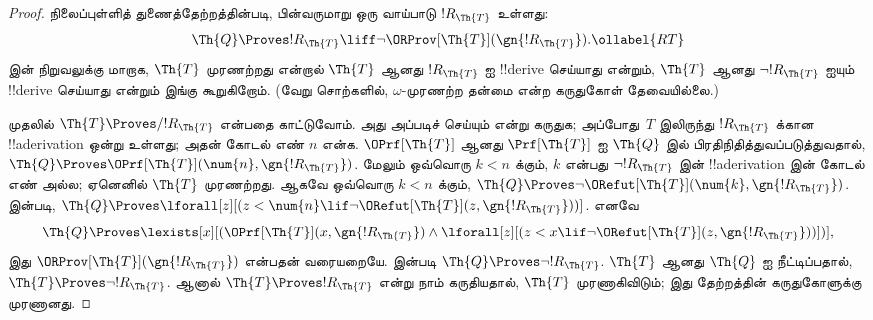 \documentclass[../../../include/open-logic-section]{subfiles}
\begin{document}
\begin{proof}
நிலைப்புள்ளித் துணைத்தேற்றத்தின்படி, பின்வருமாறு ஒரு வாய்பாடு
$!R_\Th{T}$ உள்ளது:
\begin{equation}
  \Th{Q} \Proves !R_\Th{T} \liff \lnot \ORProv[\Th{T}](\gn{!R_\Th{T}}).
  \ollabel{RT}
\end{equation}
 இன் நிறுவலுக்கு மாறாக,
$\Th{T}$ முரணற்றது என்றால் $\Th{T}$ ஆனது $!R_\Th{T}$ ஐ !!{derive}
செய்யாது என்றும், $\Th{T}$ ஆனது $\lnot !R_\Th{T}$ ஐயும்
!!{derive} செய்யாது என்றும்
இங்கு கூறுகிறோம். (வேறு சொற்களில், $\omega$-முரணற்ற தன்மை என்ற
கருதுகோள் தேவையில்லை.)

முதலில் $\Th{T} \Proves/ !R_{\Th{T}}$ என்பதை காட்டுவோம். அது
அப்படிச் செய்யும் என்று கருதுக; அப்போது~$T$ இலிருந்து
$!R_{\Th{T}}$ க்கான !!a{derivation} ஒன்று உள்ளது; அதன் கோடல் எண்
$n$ என்க. $\OPrf[\Th{T}]$ ஆனது $\Prf[\Th{T}]$ ஐ $\Th{Q}$ இல்
பிரதிநிதித்துவப்படுத்துவதால்,
$\Th{Q} \Proves
\OPrf[\Th{T}](\num{n}, \gn{!R_{\Th{T}}})$. மேலும் ஒவ்வொரு $k<n$ க்கும்,
$k$ என்பது $\lnot !R_{\Th{T}}$ இன் !!a{derivation} இன் கோடல் எண்
அல்ல; ஏனெனில் $\Th{T}$ முரணற்றது. ஆகவே ஒவ்வொரு $k<n$ க்கும்,
$\Th{Q} \Proves \lnot
\ORefut[\Th{T}](\num{k}, \gn{!R_{\Th{T}}})$. 
இன்படி,
$\Th{Q} \Proves \lforall[z][(z < \num{n} \lif \lnot
\ORefut[\Th{T}](z,\gn{!R_{\Th{T}}}))]$. எனவே
\[
\Th{Q} \Proves \lexists[x][(\OPrf[\Th{T}](x,\gn{!R_{\Th{T}}}) \land \lforall[z][(z
    < x \lif \lnot \ORefut[\Th{T}](z,\gn{!R_{\Th{T}}}))])],
\]
இது $\ORProv[\Th{T}](\gn{!R_{\Th{T}}})$ என்பதன் வரையறையே. 
  இன்படி $\Th{Q} \Proves \lnot !R_{\Th{T}}$. $\Th{T}$ ஆனது $\Th{Q}$
  ஐ நீட்டிப்பதால், $\Th{T} \Proves \lnot !R_{\Th{T}}$.
ஆனால் $\Th{T} \Proves !R_{\Th{T}}$ என்று நாம் கருதியதால், $\Th{T}$
முரணாகிவிடும்; இது தேற்றத்தின் கருதுகோளுக்கு முரணானது.


\end{proof}
\end{document}
